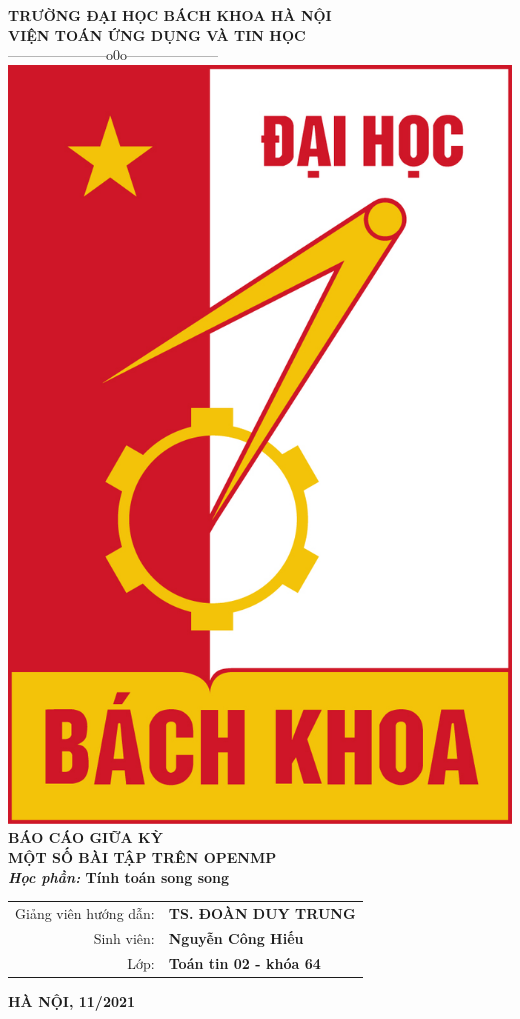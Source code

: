 \documentclass[12pt,a4paper]{report}
\begin{document}
 

\fontsize{13pt}{18pt}\selectfont   %

\setlength{\baselineskip}{18truept}
\begin{titlepage}                                                       %
\begin{center}
{\large\bf TRƯỜNG ĐẠI HỌC BÁCH KHOA HÀ NỘI}\\
{\large\bf VIỆN TOÁN ỨNG DỤNG VÀ TIN HỌC} \\
{---------------------o0o--------------------}
\vskip 1cm
\includegraphics[scale=0.4]{HUST}
\vskip 2cm
{\bf BÁO CÁO GIỮA KỲ}\\[1cm]
{\Large\bf \textbf{MỘT SỐ BÀI TẬP TRÊN OPENMP}}\\
\vskip 1cm
{\bf {\it Học phần:}  Tính toán song song}
\vskip 2cm

\begin{tabular}{r l}
Giảng viên hướng dẫn:&{\bf TS. ĐOÀN DUY TRUNG}\\[0.5cm]
Sinh viên:&{\bf Nguyễn Công Hiếu}\\[0.5cm]
Lớp:&{\bf Toán tin 02 - khóa 64}
\end{tabular}
\vfill
{\bf HÀ NỘI, 11/2021}
\end{center}
\end{titlepage}
\end{document}
